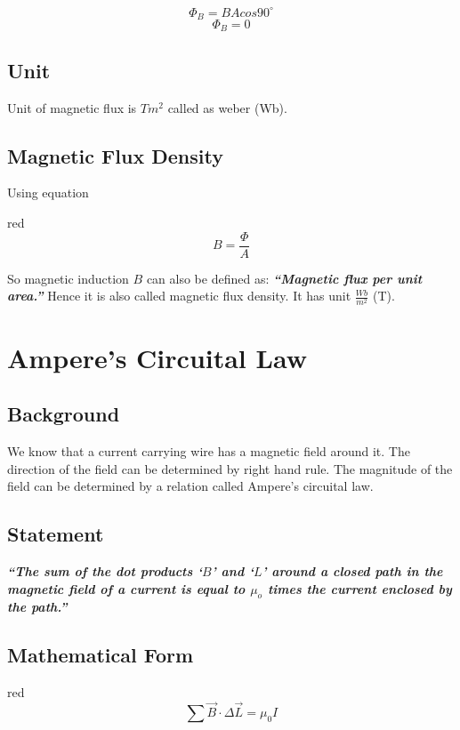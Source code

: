 \begin{equation}\nonumber
\Phi_{B} =  BA cos90^{\circ} 
\end{equation}
\begin{equation}\nonumber
\Phi_{B} = 0 
\end{equation}

\subsection*{Unit}
Unit of magnetic flux is $Tm^{2}$ called as weber (Wb).

\subsection{Magnetic Flux Density}
Using equation
\begin{mybox}{red}{}
\begin{equation}\label{eq:13.11}
B= \frac{\Phi}{A}  
\end{equation}
\end{mybox}
So magnetic induction $B$ can also be defined as:
\textit{\textbf{“Magnetic flux per unit area.”}}
Hence it is also called magnetic flux density. It has unit $\frac{Wb}{m^{2}}$ (T).

\section{Ampere’s Circuital Law}
\subsection*{Background}
 We know that a current carrying wire has a magnetic field around it.
 The direction of the field can be determined by right hand rule.
 The magnitude of the field can be determined by a relation called 
 Ampere’s circuital law.
 \subsection*{Statement}
 \textit{\textbf{“The sum of the dot products ‘$B$’ and ‘$L$’ around a closed path in the magnetic field of a current is equal to $\mu_{o}$ times the current enclosed by the path.”}}
\subsection*{Mathematical Form}
\begin{mybox}{red}{}
\begin{equation}
\sum \vec{B}\cdot\Delta\vec{L}= \mu_{0}I 
\end{equation}
\end{mybox}
